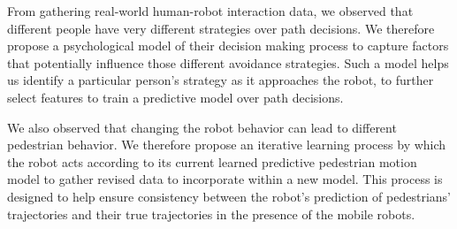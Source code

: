 \documentclass[conference]{IEEEtran}
\begin{document}

From gathering real-world human-robot interaction data, we 
observed that different people have very different strategies over path 
decisions. We therefore propose a psychological model of their decision making 
process to capture factors that potentially influence those different avoidance 
strategies. Such a model helps us identify a particular person's strategy as it 
approaches the robot, to further select features to train a predictive model 
over path decisions.
 

We also observed that changing the robot behavior
can lead to different pedestrian behavior.  We therefore
propose an iterative learning process by which the robot acts
according to its current learned predictive pedestrian motion model
to gather revised data to incorporate within a new model.  This
process is designed to help ensure consistency between the robot's
prediction of pedestrians' trajectories and their true trajectories in
the presence of the mobile robots.



\end{document}

